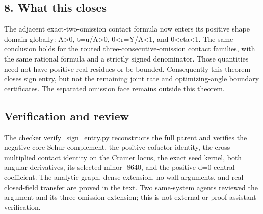 \hypertarget{what-this-closes}{%
\subsection{8. What this closes}\label{pe31b9ef5ec43:what-this-closes}}

The adjacent exact-two-omission contact formula now enters its positive
shape domain globally: A\textgreater0, t=u/A\textgreater0, 0\textless r=Y/A\textless1, and 0\textless eta\textless1.
The same conclusion holds for the routed three-consecutive-omission contact
families, with the same rational formula and a strictly signed denominator.
Those quantities need not have positive real residues or be bounded.
Consequently this theorem closes sign entry, but not the remaining joint
rate and optimizing-angle boundary certificates. The separated omission
face remains outside this theorem.

\hypertarget{verification-and-review}{%
\subsection{Verification and review}\label{pe31b9ef5ec43:verification-and-review}}

The checker verify\_sign\_entry.py reconstructs the full parent and verifies
the negative-core Schur complement, the positive cofactor identity, the
cross-multiplied contact identity on the Cramer locus, the exact seed kernel,
both angular derivatives, its selected minor -8640, and the positive d=0
central coefficient. The analytic graph, dense extension, no-wall arguments,
and real-closed-field transfer are proved in the text. Two same-system
agents reviewed the argument and its three-omission extension; this is not
external or proof-assistant verification.
